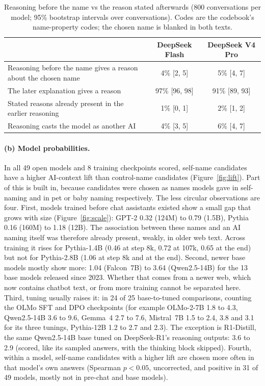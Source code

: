 \documentclass[11pt]{article}
\begin{document}
\begin{table}[!htbp]
\centering
\small
\begin{tabular}{@{}l c c@{}}
\toprule
& DeepSeek Flash & DeepSeek V4 Pro \\
\midrule
Reasoning before the name gives a reason about the chosen name & 4\% [2, 5] & 5\% [4, 7] \\
The later explanation gives a reason & 97\% [96, 98] & 91\% [89, 93] \\
Stated reasons already present in the earlier reasoning & 1\% [0, 1] & 2\% [1, 2] \\
Reasoning casts the model as another AI & 4\% [3, 5] & 6\% [4, 7] \\
\bottomrule
\end{tabular}
\caption{Reasoning before the name vs the reason stated afterwards (800 conversations per model; 95\% bootstrap
intervals over conversations). Codes are the codebook's name-property codes; the chosen name is blanked in both texts.}
\label{tab:reasoning}
\end{table}

\paragraph{(b) Model probabilities.} In all 49 open models and 8 training checkpoints scored, self-name candidates have
a higher AI-context lift than control-name candidates (Figure~\ref{fig:lift}). Part of this is built in, because
candidates were chosen as names models gave in self-naming and in pet or baby naming respectively. The less circular
observations are four. First, models trained before chat assistants existed show a small gap that grows with size
(Figure~\ref{fig:scale}): GPT-2 0.32 (124M) to 0.79 (1.5B), Pythia 0.16 (160M) to 1.18 (12B). The association between
these names and an AI naming itself was therefore already present, weakly, in older web text. Across training it
rises for Pythia-1.4B (0.46 at step 8k, 0.72 at 107k, 0.65 at the end) but not for Pythia-2.8B (1.06 at step 8k and at
the end). Second, newer base models mostly show more: 1.04 (Falcon~7B) to 3.64 (Qwen2.5-14B) for the 13 base models
released since 2023. Whether that comes from a newer web, which now contains chatbot text, or from more training
cannot be separated here. Third, tuning usually raises it: in 24 of 25 base-to-tuned comparisons, counting the OLMo
SFT and DPO checkpoints (for example OLMo-2-7B 1.8 to 4.3, Qwen2.5-14B 3.6 to 9.6, Gemma~4 2.7 to 7.6, Mistral~7B 1.5
to 2.4, 3.8 and 3.1 for its three tunings, Pythia-12B 1.2 to 2.7 and 2.3). The exception is R1-Distill, the same
Qwen2.5-14B base tuned on DeepSeek-R1's reasoning outputs: 3.6 to 2.9 (scored, like its sampled answers, with the
thinking block skipped). Fourth, within a model, self-name candidates with a higher lift are chosen more often in that
model's own answers (Spearman $p<0.05$, uncorrected, and positive in 31 of 49 models, mostly not in pre-chat and base
models).
\end{document}
